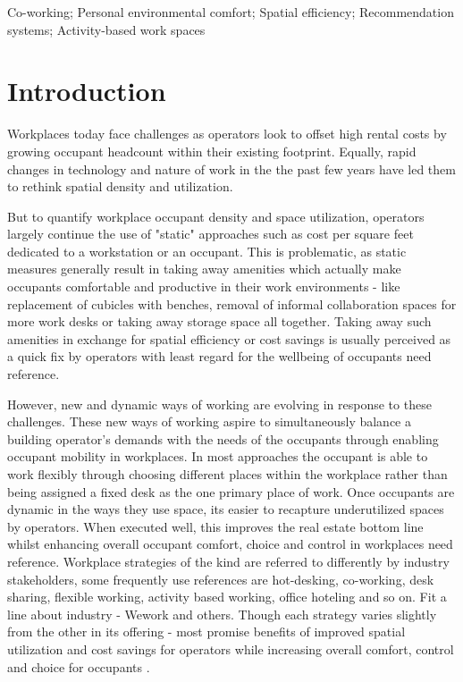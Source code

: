 \documentclass[]{interact}
\theoremstyle{plain}%
\theoremstyle{definition}
\theoremstyle{remark}
\begin{document}
\begin{keywords}
Co-working; Personal environmental comfort; Spatial efficiency; Recommendation systems; Activity-based work spaces
\end{keywords}


\section{Introduction}
Workplaces today face challenges as operators look to offset high rental costs by growing occupant headcount within their existing footprint. Equally, rapid changes in technology and nature of work in the the past few years have led them to rethink spatial density and utilization. 

But to quantify workplace occupant density and space utilization, operators largely continue the use of "static" approaches such as cost per square feet dedicated to a workstation or an occupant. This is problematic, as static measures generally result in taking away amenities which actually make occupants comfortable and productive in their work environments - like replacement of cubicles with benches, removal of informal collaboration spaces for more work desks or taking away storage space all together. Taking away such amenities in exchange for spatial efficiency or cost savings is usually perceived as a quick fix by operators with least regard for the wellbeing of occupants {need reference}.

However, new and dynamic ways of working are evolving in response to these challenges. These new ways of working aspire to simultaneously balance a building operator's demands with the needs of the occupants through enabling occupant mobility in workplaces. In most approaches the occupant is able to work flexibly through choosing different places within the workplace rather than being assigned a fixed desk as the one primary place of work. Once occupants are dynamic in the ways they use space, its easier to recapture underutilized spaces by operators. When executed well, this improves the real estate bottom line whilst enhancing overall occupant comfort, choice and control in workplaces {need reference}. Workplace strategies of the kind are referred to differently by industry stakeholders, some frequently use references are hot-desking, co-working, desk sharing, flexible working, activity based working, office hoteling and so on. Fit a line about industry - Wework and others. Though each strategy varies slightly from the other in its offering - most promise benefits of improved spatial utilization and cost savings for operators while increasing overall comfort, control and choice for occupants \citep{Engelen2018IsReview}. %
\end{document}
